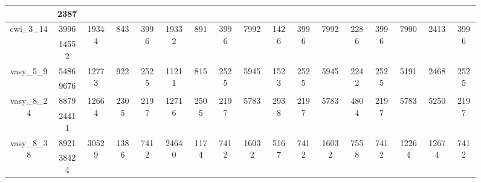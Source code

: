 \documentclass[../master/master.tex]{subfiles}
\begin{document}
\begin{figure}
\begin{adjustbox}{angle=90}
\begin{tabular}{ |c|c||c|c|c||c|c|c||c|c|c||c|c|c||c|c|c|| }
\cline{2-2}
 & 2387  &  &  &  &  &  &  &  &  &  &  &  &  &  &  &  \\
\hline
\multirow{2}{3.4em}{cwi\_3\_14} & 3996 & \multirow{2}{3.4em}{19344} & \multirow{2}{3.4em}{843} & \multirow{2}{3.4em}{3996} & \multirow{2}{3.4em}{19332} & \multirow{2}{3.4em}{891} & \multirow{2}{3.4em}{3996} & \multirow{2}{3.4em}{7992} & \multirow{2}{3.4em}{1426} & \multirow{2}{3.4em}{3996} & \multirow{2}{3.4em}{7992} & \multirow{2}{3.4em}{2286} & \multirow{2}{3.4em}{3996} & \multirow{2}{3.4em}{7990} & \multirow{2}{3.4em}{2413} & \multirow{2}{3.4em}{3996} \\
\cline{2-2}
 & 14552  &  &  &  &  &  &  &  &  &  &  &  &  &  &  &  \\
\hline
\multirow{2}{3.4em}{vasy\_5\_9} & 5486 & \multirow{2}{3.4em}{12773} & \multirow{2}{3.4em}{922} & \multirow{2}{3.4em}{2525} & \multirow{2}{3.4em}{11211} & \multirow{2}{3.4em}{815} & \multirow{2}{3.4em}{2525} & \multirow{2}{3.4em}{5945} & \multirow{2}{3.4em}{1523} & \multirow{2}{3.4em}{2525} & \multirow{2}{3.4em}{5945} & \multirow{2}{3.4em}{2242} & \multirow{2}{3.4em}{2525} & \multirow{2}{3.4em}{5191} & \multirow{2}{3.4em}{2468} & \multirow{2}{3.4em}{2525} \\
\cline{2-2}
 & 9676  &  &  &  &  &  &  &  &  &  &  &  &  &  &  &  \\
\hline
\multirow{2}{3.4em}{vasy\_8\_24} & 8879 & \multirow{2}{3.4em}{12664} & \multirow{2}{3.4em}{2305} & \multirow{2}{3.4em}{2197} & \multirow{2}{3.4em}{12716} & \multirow{2}{3.4em}{2505} & \multirow{2}{3.4em}{2197} & \multirow{2}{3.4em}{5783} & \multirow{2}{3.4em}{2938} & \multirow{2}{3.4em}{2197} & \multirow{2}{3.4em}{5783} & \multirow{2}{3.4em}{4804} & \multirow{2}{3.4em}{2197} & \multirow{2}{3.4em}{5783} & \multirow{2}{3.4em}{5250} & \multirow{2}{3.4em}{2197} \\
\cline{2-2}
 & 24411  &  &  &  &  &  &  &  &  &  &  &  &  &  &  &  \\
\hline
\multirow{2}{3.4em}{vasy\_8\_38} & 8921 & \multirow{2}{3.4em}{30529} & \multirow{2}{3.4em}{1386} & \multirow{2}{3.4em}{7412} & \multirow{2}{3.4em}{24640} & \multirow{2}{3.4em}{1174} & \multirow{2}{3.4em}{7412} & \multirow{2}{3.4em}{16032} & \multirow{2}{3.4em}{5167} & \multirow{2}{3.4em}{7412} & \multirow{2}{3.4em}{16032} & \multirow{2}{3.4em}{7558} & \multirow{2}{3.4em}{7412} & \multirow{2}{3.4em}{12264} & \multirow{2}{3.4em}{12674} & \multirow{2}{3.4em}{7412} \\
\cline{2-2}
 & 38424  &  &  &  &  &  &  &  &  &  &  &  &  &  &  &  \\
\hline

\end{tabular}
\end{adjustbox}
\end{figure}
\end{document}
